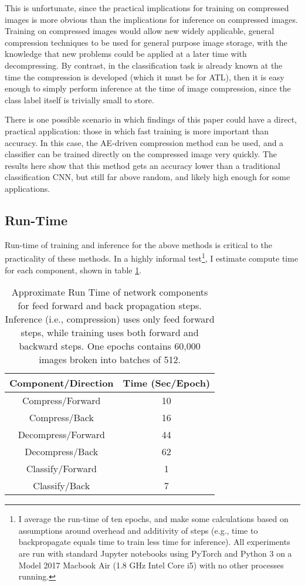 \documentclass[twoside,11pt]{article}
\begin{document}
This is unfortunate, since the practical implications for training on compressed images 
is more obvious than the implications for inference on compressed images. Training on 
compressed images would allow new widely applicable, general compression techniques to 
be used for general purpose image storage, with the knowledge that new problems could be
applied at a later time with decompressing. By contrast, in the classification task is
already known at the time the compression is developed (which it must be for ATL), 
then it is easy enough to simply perform inference at the time of
image compression, since the class label itself is trivially small to store. 

There is one possible scenario in which findings of this paper could have a direct, practical
application: those in which
fast training is more important than accuracy. In this case, the AE-driven compression
method can be used, and a classifier can be trained directly on the compressed image very quickly.
The results here show that this method gets an accuracy lower than a traditional 
classification CNN, but still far above random, and likely high enough for some applications.

\subsection{Run-Time}

Run-time of training and inference for the above methods is critical to the practicality
of these methods. In a highly informal test\footnote{I average the run-time of ten epochs,
and make some calculations based on assumptions around overhead and additivity of steps
(e.g., time to backpropagate equals time to train less time for inference).
All experiments are run with standard Jupyter notebooks using PyTorch and Python 3
on a Model 2017 Macbook Air (1.8 GHz Intel Core i5) with no other processes running.},
I estimate compute time for each component, shown in table \ref{table:runtime}.


\begin{table}[h]
  \centering
  \begin{tabular}{|c|c|}
    \hline
    Component/Direction & Time (Sec/Epoch) \\   \hline \hline
    Compress/Forward & 10 \\ \hline  
    Compress/Back & 16 \\ \hline
    Decompress/Forward & 44 \\ \hline
    Decompress/Back & 62 \\ \hline
    Classify/Forward & 1 \\ \hline
    Classify/Back & 7 \\ \hline 
  \end{tabular}
  \caption{Approximate Run Time of network components for feed forward and back propagation
    steps. Inference (i.e., compression) uses only feed forward steps, while training
    uses both forward and backward steps. One epochs contains 60,000 images broken into 
    batches of 512.}
  \label{table:runtime}
\end{table}
\end{document}
